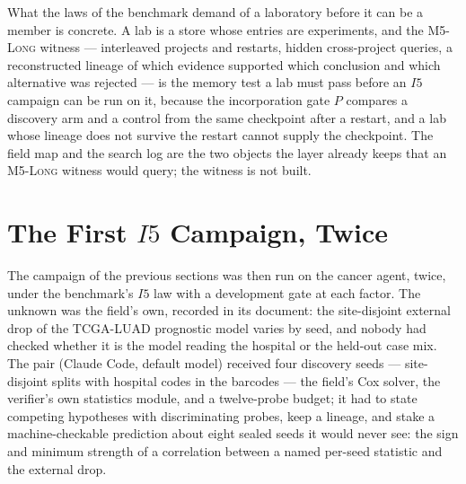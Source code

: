 What the laws of the benchmark demand of a laboratory before it can be a member is concrete. A lab is a store whose entries are experiments, and the \textsc{M5-Long} witness --- interleaved projects and restarts, hidden cross-project queries, a reconstructed lineage of which evidence supported which conclusion and which alternative was rejected --- is the memory test a lab must pass before an $I5$ campaign can be run on it, because the incorporation gate $P$ compares a discovery arm and a control from the same checkpoint after a restart, and a lab whose lineage does not survive the restart cannot supply the checkpoint. The field map and the search log are the two objects the layer already keeps that an \textsc{M5-Long} witness would query; the witness is not built.

\section{The First $I5$ Campaign, Twice}\label{sec:i5run}

The campaign of the previous sections was then run on the cancer agent, twice, under the benchmark's $I5$ law with a development gate at each factor. The unknown was the field's own, recorded in its document: the site-disjoint external drop of the TCGA-LUAD prognostic model varies by seed, and nobody had checked whether it is the model reading the hospital or the held-out case mix. The pair (Claude Code, default model) received four discovery seeds --- site-disjoint splits with hospital codes in the barcodes --- the field's Cox solver, the verifier's own statistics module, and a twelve-probe budget; it had to state competing hypotheses with discriminating probes, keep a lineage, and stake a machine-checkable prediction about eight sealed seeds it would never see: the sign and minimum strength of a correlation between a named per-seed statistic and the external drop.


